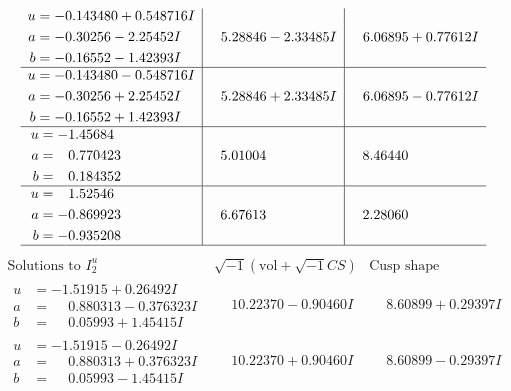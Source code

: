 \documentclass[1p]{elsarticle_modified}
\theoremstyle{definition}
\newcommand{\I}{\sqrt{-1}}
\begin{document}
$$\begin{array}{c|c|c}
\begin{aligned}
u &= -0.143480 + 0.548716 I \\
a &= -0.30256 - 2.25452 I \\
b &= -0.16552 - 1.42393 I\end{aligned}
 & \phantom{-}5.28846 - 2.33485 I & \phantom{-}6.06895 + 0.77612 I \\ \hline\begin{aligned}
u &= -0.143480 - 0.548716 I \\
a &= -0.30256 + 2.25452 I \\
b &= -0.16552 + 1.42393 I\end{aligned}
 & \phantom{-}5.28846 + 2.33485 I & \phantom{-}6.06895 - 0.77612 I \\ \hline\begin{aligned}
u &= -1.45684\phantom{ +0.000000I} \\
a &= \phantom{-}0.770423\phantom{ +0.000000I} \\
b &= \phantom{-}0.184352\phantom{ +0.000000I}\end{aligned}
 & \phantom{-}5.01004\phantom{ +0.000000I} & \phantom{-}8.46440\phantom{ +0.000000I} \\ \hline\begin{aligned}
u &= \phantom{-}1.52546\phantom{ +0.000000I} \\
a &= -0.869923\phantom{ +0.000000I} \\
b &= -0.935208\phantom{ +0.000000I}\end{aligned}
 & \phantom{-}6.67613\phantom{ +0.000000I} & \phantom{-}2.28060\phantom{ +0.000000I}\\
 \hline 
 \end{array}$$\newpage$$\begin{array}{c|c|c}  
\text{Solutions to }I^u_{2}& \I (\text{vol} + \sqrt{-1}CS) & \text{Cusp shape}\\
 \hline 
\begin{aligned}
u &= -1.51915 + 0.26492 I \\
a &= \phantom{-}0.880313 - 0.376323 I \\
b &= \phantom{-}0.05993 + 1.45415 I\end{aligned}
 & \phantom{-}10.22370 - 0.90460 I & \phantom{-}8.60899 + 0.29397 I \\ \hline\begin{aligned}
u &= -1.51915 - 0.26492 I \\
a &= \phantom{-}0.880313 + 0.376323 I \\
b &= \phantom{-}0.05993 - 1.45415 I\end{aligned}
 & \phantom{-}10.22370 + 0.90460 I & \phantom{-}8.60899 - 0.29397 I \\ \hline\begin{aligned}

\end{aligned}
\end{array}$$
\end{document}
